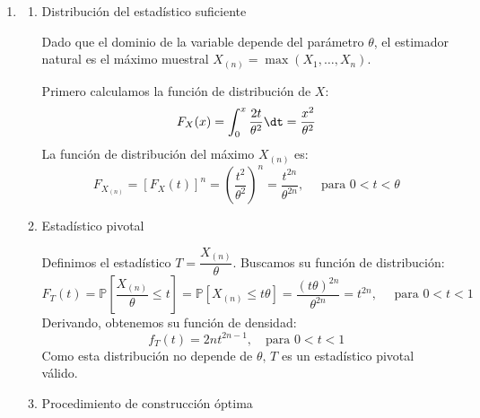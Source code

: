 \begin{enumerate}[label=\color{red}\textbf{\arabic*)}]
\begin{enumerate}[label=\arabic*)]
		            Para despejar $\sigma^2$, primero invertimos las fracciones, lo cual invierte el sentido de las desigualdades matemáticas: \[
			            \mathbb{P}\left[ \dfrac{1}{\chi_{n-1,1-\alpha /2}^2}\le \dfrac{\sigma^2}{(n-1)S_n^2}\le \dfrac{1}{\chi_{n-1,\alpha /2}^2} \right] =1-\alpha
		            \]
		            A continuación, multiplicamos todos los términos de la inecuación por el numerador $(n-1)S_n^2$ para aislar el parámetro: \[
			            \mathbb{P}\left[ \dfrac{(n-1)S_n^2}{\chi_{n-1,1-\alpha /2}^2}\le \sigma^2\le \dfrac{(n-1)S_n^2}{\chi_{n-1,\alpha /2}^2} \right] =1-\alpha
		            \]
		      \item Intervalo de confianza:

		            Expresado en forma de intervalo: \[
			            IC_{1-\alpha}(\sigma^2)=\left( \dfrac{(n-1)S_n^2}{\chi_{n-1,1-\alpha /2}^2},\dfrac{(n-1)S_n^2}{\chi_{n-1,\alpha /2}^2} \right)
		            \]
	      \end{enumerate}
	\item {}

	      \begin{enumerate}[label=\arabic*)]
		      \item Distribución del estadístico suficiente

		            Dado que el dominio de la variable depende del parámetro $\theta$, el estimador natural es el máximo muestral $X_{(n)}=\max(X_1,\dots,X_n)$.

		            Primero calculamos la función de distribución de $X$: \[
			            F_X(x)=\int_{0}^{x} \dfrac{2t}{\theta^2}\dt=\dfrac{x^2}{\theta^2}
		            \]
		            La función de distribución del máximo $X_{(n)}$ es: \[
			            F_{X_{(n)}}=[F_X(t)]^n=\left( \dfrac{t^2}{\theta^2} \right)^n=\dfrac{t^{2n}}{\theta^{2n}},\quad \text{ para }0<t<\theta
		            \]
		      \item Estadístico pivotal

		            Definimos el estadístico $T=\dfrac{X_{(n)}}{\theta}$. Buscamos su función de distribución: \[
			            F_T(t)=\mathbb{P}\left[ \dfrac{X_{(n)}}{\theta}\le t \right]=\mathbb{P}[X_{(n)}\le t\theta]=\dfrac{(t\theta)^{2n}}{\theta^{2n}}=t^{2n},\quad \text{ para }0<t<1
		            \]
		            Derivando, obtenemos su función de densidad: \[
			            f_T(t)=2nt^{2n-1},\quad \text{para }0<t<1
		            \]
		            Como esta distribución no depende de $\theta,\,T$ es un estadístico pivotal válido.
		      \item Procedimiento de construcción óptima


\end{enumerate}
\end{enumerate}
